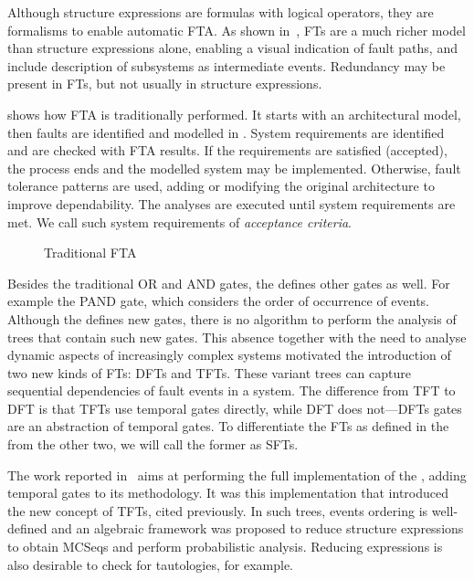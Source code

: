 Although structure expressions are formulas with logical operators, they are formalisms to enable automatic \ac{FTA}.
As shown in~\cite{Ericson2005}, \acp{FT} are a much richer model than structure expressions alone, enabling a visual indication of fault paths, and include description of subsystems as intermediate events.
Redundancy may be present in \acp{FT}, but not usually in structure expressions.

 shows how \ac{FTA} is traditionally performed.
It starts with an architectural model, then faults are identified and modelled in .
System requirements are identified and are checked with \ac{FTA} results.
If the requirements are satisfied (accepted), the process ends and the modelled system may be implemented.
Otherwise, fault tolerance patterns are used, adding or modifying the original architecture to improve dependability.
The analyses are executed until system requirements are met.
We call such system requirements of  \emph{acceptance criteria}.

\begin{figure}[htb]
  \centering
  \caption{Traditional \ac{FTA}}
  \label{fig:strategy-overview-traditional}
\end{figure}

Besides the traditional \ac{OR} and \ac{AND} gates, the \FThandbook defines other gates as well.
For example the \ac{PAND} gate, which considers the order of occurrence of events.
Although the \FThandbook defines new gates, there is no algorithm to perform the analysis of trees that contain such new gates.
This absence together with the need to analyse dynamic aspects of increasingly complex systems motivated the introduction of two new kinds of \aclp{FT}: \acp{DFT} and \acp{TFT}.
These variant trees can capture sequential dependencies of fault events in a system.
The difference from \ac{TFT} to \ac{DFT} is that \acp{TFT} use temporal gates directly, while \ac{DFT} does not---\acp{DFT} gates are an abstraction of temporal gates.
To differentiate the \aclp{FT} as defined in the \FThandbook from the other two, we will call the former as \acp{SFT}.

The work reported in~\cite{WP2009} aims at performing the full implementation of the \FThandbook, adding temporal gates to its \pandora methodology.
It was this implementation that introduced the new concept of \acp{TFT}, cited previously.
In such trees, events ordering is well-defined and an algebraic framework was proposed to reduce structure expressions to obtain \acp{MCSeq} and perform probabilistic analysis.
Reducing expressions is also desirable to check for tautologies, for example.

